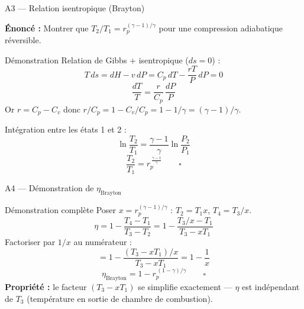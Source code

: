 \documentclass[aspectratio=43, 10pt]{beamer}
\newcommand{\rp}{r_p}
\begin{document}
\begin{frame}{A3 --- Relation isentropique (Brayton)}

  \textbf{\'Enonc\'e :} Montrer que
  $T_2/T_1 = \rp^{(\gamma-1)/\gamma}$
  pour une compression adiabatique r\'eversible.

  \begin{block}{D\'emonstration}
    Relation de Gibbs + isentropique ($ds=0$) :
    \[
      T\,ds = dH - v\,dP = C_p\,dT - \frac{rT}{P}\,dP = 0
    \]
    \[
      \frac{dT}{T}
      = \frac{r}{C_p}\,\frac{dP}{P}
    \]
    Or $r = C_p - C_v$ donc
    $r/C_p = 1 - C_v/C_p = 1 - 1/\gamma = (\gamma-1)/\gamma$.

    Int\'egration entre les \'etats 1 et 2 :
    \[
      \ln\!\frac{T_2}{T_1}
      = \frac{\gamma-1}{\gamma}\ln\!\frac{P_2}{P_1}
    \]
    \[
      \boxed{\frac{T_2}{T_1} = \rp^{\,\frac{\gamma-1}{\gamma}}}
      \qquad\square
    \]
  \end{block}
\end{frame}

\begin{frame}{A4 --- D\'emonstration de $\eta_{\text{Brayton}}$}

  \begin{block}{D\'emonstration compl\`ete}
    Poser $x = \rp^{(\gamma-1)/\gamma}$ :
    $T_2 = T_1 x$, $T_4 = T_3/x$.
    \[
      \eta = 1 - \frac{T_4 - T_1}{T_3 - T_2}
           = 1 - \frac{T_3/x - T_1}{T_3 - xT_1}
    \]
    Factoriser par $1/x$ au num\'erateur :
    \[
      = 1 - \frac{(T_3 - xT_1)/x}{T_3 - xT_1}
      = 1 - \frac{1}{x}
    \]
    \[
      \boxed{\eta_{\text{Brayton}} = 1 - \rp^{\,(1-\gamma)/\gamma}}
      \qquad\square
    \]
    \textbf{Propri\'et\'e :} le facteur $(T_3 - xT_1)$ se simplifie
    exactement --- $\eta$ est ind\'ependant de $T_3$ (temp\'erature
    en sortie de chambre de combustion).
  \end{block}

\end{frame}
\end{document}
